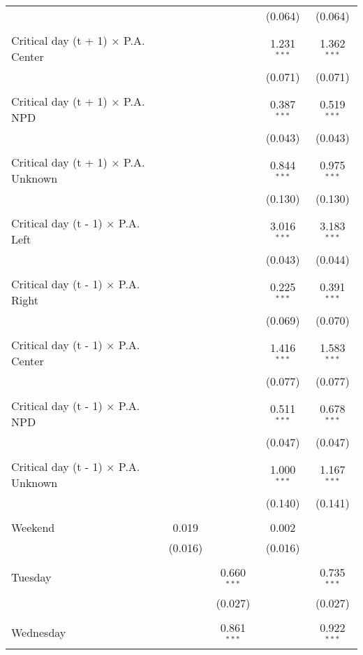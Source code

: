 \documentclass[
]{article}
\begin{document}
\begin{table}[!htbp]
{\begin{tabular}{@{\extracolsep{5pt}}lcccc}
  &  &  & (0.064) & (0.064) \\ 
  & & & & \\ 
 Critical day (t + 1) $\times$ P.A. Center &  &  & 1.231$^{***}$ & 1.362$^{***}$ \\ 
  &  &  & (0.071) & (0.071) \\ 
  & & & & \\ 
 Critical day (t + 1) $\times$ P.A. NPD &  &  & 0.387$^{***}$ & 0.519$^{***}$ \\ 
  &  &  & (0.043) & (0.043) \\ 
  & & & & \\ 
 Critical day (t + 1) $\times$ P.A. Unknown &  &  & 0.844$^{***}$ & 0.975$^{***}$ \\ 
  &  &  & (0.130) & (0.130) \\ 
  & & & & \\ 
 Critical day (t - 1) $\times$ P.A. Left &  &  & 3.016$^{***}$ & 3.183$^{***}$ \\ 
  &  &  & (0.043) & (0.044) \\ 
  & & & & \\ 
 Critical day (t - 1) $\times$ P.A. Right &  &  & 0.225$^{***}$ & 0.391$^{***}$ \\ 
  &  &  & (0.069) & (0.070) \\ 
  & & & & \\ 
 Critical day (t - 1) $\times$ P.A. Center &  &  & 1.416$^{***}$ & 1.583$^{***}$ \\ 
  &  &  & (0.077) & (0.077) \\ 
  & & & & \\ 
 Critical day (t - 1) $\times$ P.A. NPD &  &  & 0.511$^{***}$ & 0.678$^{***}$ \\ 
  &  &  & (0.047) & (0.047) \\ 
  & & & & \\ 
 Critical day (t - 1) $\times$ P.A. Unknown &  &  & 1.000$^{***}$ & 1.167$^{***}$ \\ 
  &  &  & (0.140) & (0.141) \\ 
  & & & & \\ 
 Weekend & 0.019 &  & 0.002 &  \\ 
  & (0.016) &  & (0.016) &  \\ 
  & & & & \\ 
 Tuesday &  & 0.660$^{***}$ &  & 0.735$^{***}$ \\ 
  &  & (0.027) &  & (0.027) \\ 
  & & & & \\ 
 Wednesday &  & 0.861$^{***}$ &  & 0.922$^{***}$ \\ 

\end{tabular}}
\end{table}
\end{document}
